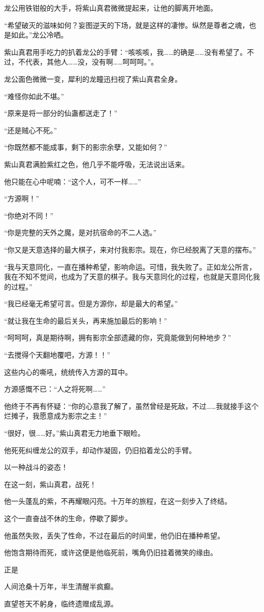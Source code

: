 \begin{this_body}
龙公用铁钳般的大手，将紫山真君微微提起来，让他的脚离开地面。

“希望破灭的滋味如何？妄图逆天的下场，就是这样的凄惨。纵然是尊者之魂，也是如此。”龙公冷哂。

紫山真君用手吃力的扒着龙公的手臂：“咳咳咳，我……的确是……没有希望了。不过，不代表，其他人……没，没有啊……呵呵呵。”。

龙公面色微微一变，犀利的龙瞳迅扫视了紫山真君全身。

“难怪你如此不堪。”

“原来是将一部分的仙蛊都送走了！”

“还是贼心不死。”

“你既然都不能成事，剩下的影宗余孽，又能如何？”

紫山真君满脸紫红之色，他几乎不能呼吸，无法说出话来。

他只能在心中呢喃：“这个人，可不一样……”

“方源啊！”

“你绝对不同！”

“你是完整的天外之魔，是对抗宿命的不二人选。”

“你又是天意选择的最大棋子，来对付我影宗。现在，你已经脱离了天意的摆布。”

“我与天意同化，一直在播种希望，影响命运。可惜，我失败了。正如龙公所言，我在不知不觉间，也成为了天意的棋子。我与天意同化的过程，也就是天意同化我的过程。”

“我已经毫无希望可言。但是方源你，却是最大的希望。”

“就让我在生命的最后关头，再来施加最后的影响！”

“呵呵呵，真是期待啊，拥有影宗全部遗藏的你，究竟能做到何种地步？”

“去搅得个天翻地覆吧，方源！！”

这些内心的嘶吼，统统传入方源的耳中。

方源感慨不已：“人之将死啊……”

他终于不再有怀疑：“你的心意我了解了，虽然曾经是死敌，不过……我就接手这个烂摊子，我愿意成为影宗之主！”

“很好，很……好。”紫山真君无力地垂下眼睑。

他死死纠缠龙公的双手，却动作凝固，仍旧掐着龙公的手臂。

以一种战斗的姿态！

在这一刻，紫山真君，战死！

他一头蓬乱的紫，不再耀眼闪亮。十万年的旅程，在这一刻步入了终结。

这个一直奋战不休的生命，停歇了脚步。

他虽然失败，丢失了性命，不过在最后的时间里，他仍旧在播种希望。

他饱含期待而死，或许这便是他临死前，嘴角仍旧挂着微笑的缘由。

正是

人间沧桑十万年，半生清醒半疯癫。

直望苍天不躬身，临终遗赠成乱源。

\end{this_body}


